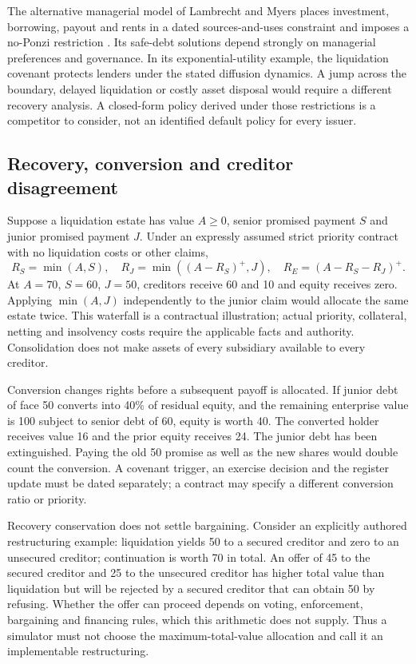 \documentclass[11pt,a4paper]{article}
\begin{document}
The alternative managerial model of Lambrecht and Myers places investment,
borrowing, payout and rents in a dated sources-and-uses constraint and imposes
a no-Ponzi restriction \cite[Sections~2--4]{lambrecht}. Its safe-debt
solutions depend strongly on managerial preferences and governance. In its
exponential-utility example, the liquidation covenant protects lenders under
the stated diffusion dynamics. A jump across the boundary, delayed liquidation
or costly asset disposal would require a different recovery analysis. A
closed-form policy derived under those restrictions is a competitor to
consider, not an identified default policy for every issuer.

\subsection{Recovery, conversion and creditor disagreement}
Suppose a liquidation estate has value $A\geq0$, senior promised payment $S$
and junior promised payment $J$. Under an expressly assumed strict priority
contract with no liquidation costs or other claims,
\begin{equation}
R_S=\min(A,S),\quad
R_J=\min((A-R_S)^+,J),\quad
R_E=(A-R_S-R_J)^+.
\end{equation}
At $A=70$, $S=60$, $J=50$, creditors receive 60 and 10 and equity receives
zero. Applying $\min(A,J)$ independently to the junior claim would allocate
the same estate twice. This waterfall is a contractual illustration; actual
priority, collateral, netting and insolvency costs require the applicable
facts and authority. Consolidation does not make assets of every subsidiary
available to every creditor.

Conversion changes rights before a subsequent payoff is allocated. If junior
debt of face 50 converts into 40\% of residual equity, and the remaining
enterprise value is 100 subject to senior debt of 60, equity is worth 40.
The converted holder receives value 16 and the prior equity receives 24.
The junior debt has been extinguished. Paying the old 50 promise as well as
the new shares would double count the conversion. A covenant trigger, an
exercise decision and the register update must be dated separately; a
contract may specify a different conversion ratio or priority.

Recovery conservation does not settle bargaining. Consider an explicitly
authored restructuring example: liquidation yields 50 to a secured creditor
and zero to an unsecured creditor; continuation is worth 70 in total. An
offer of 45 to the secured creditor and 25 to the unsecured creditor has
higher total value than liquidation but will be rejected by a secured creditor
that can obtain 50 by refusing. Whether the offer can proceed depends on
voting, enforcement, bargaining and financing rules, which this arithmetic
does not supply. Thus a simulator must not choose the maximum-total-value
allocation and call it an implementable restructuring.
\end{document}
